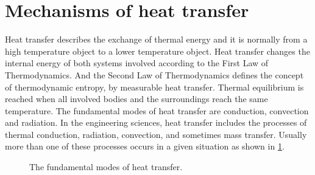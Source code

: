 \section{Mechanisms of heat transfer}

Heat transfer describes the exchange of thermal energy and it is normally from a high temperature object to a lower temperature object.
Heat transfer changes the internal energy of both systems involved according to the First Law of Thermodynamics.
And the Second Law of Thermodynamics defines the concept of thermodynamic entropy, by measurable heat transfer.
Thermal equilibrium is reached when all involved bodies and the surroundings reach the same temperature.
The fundamental modes of heat transfer are conduction, convection and radiation.
In the engineering sciences, heat transfer includes the processes of thermal conduction, radiation, convection, and sometimes mass transfer.
Usually more than one of these processes occurs in a given situation as shown in \ref{Fig:HeatTransfer}.
\begin{figure}[!htp]
\centering{}
\caption{The fundamental modes of heat transfer.}
\label{Fig:HeatTransfer}
\end{figure}

